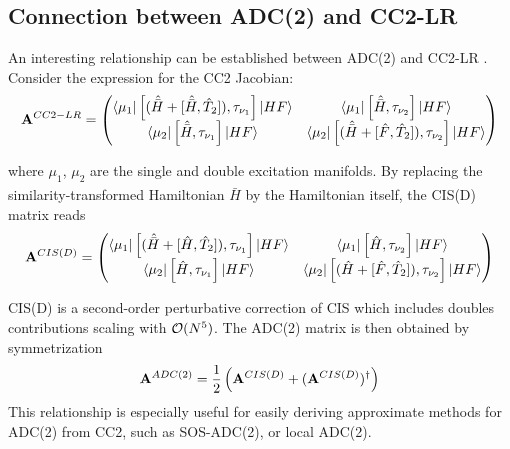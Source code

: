 
\subsection{Connection between ADC(2) and CC2-LR} 

An interesting relationship can be established between ADC(2) and CC2-LR \cite{Hf2005}. Consider the expression for the CC2 Jacobian:
\begin{equation}
\mathbf{A}^{CC2-LR} = \left( \begin{matrix}
\bra{\smash{\mu_1}} \left[ (\hat{\bar{H}} + \left[ \smash{ \hat{\bar{H}},\hat{T}_2} \right]), \tau_{\nu_1} \right] \ket{\smash{HF}} &  \bra{\smash{\mu_1}} \left[ \hat{\bar{H}}, \tau_{\nu_2} \right] \ket{\smash{HF}} \\
\bra{\smash{\mu_2}} \left[ \hat{\bar{H}}, \tau_{\nu_1} \right] \ket{\smash{HF}} & \bra{\smash{\mu_2}} \left[ (\hat{\bar{H}} + \left[ \smash{ \hat{F},\hat{T}_2} \right]), \tau_{\nu_2} \right] \ket{\smash{HF}}
\end{matrix}
\right)
\end{equation}

\noindent where $\mu_1$, $\mu_2$ are the single and double excitation manifolds. By replacing the similarity-transformed Hamiltonian $\hat{\bar{H}}$ by the Hamiltonian itself, the CIS(D) matrix reads
\begin{equation}
\mathbf{A}^{CIS(D)} = \left( \begin{matrix}
\bra{\smash{\mu_1}} \left[ (\hat{\bar{H}} + \left[ \smash{ \hat{H},\hat{T}_2} \right]), \tau_{\nu_1} \right] \ket{\smash{HF}} &  \bra{\smash{\mu_1}} \left[ \hat{H}, \tau_{\nu_2} \right] \ket{\smash{HF}} \\
\bra{\smash{\mu_2}} \left[ \hat{H}, \tau_{\nu_1} \right] \ket{\smash{HF}} & \bra{\smash{\mu_2}} \left[ (\hat{H} + \left[ \smash{ \hat{F},\hat{T}_2} \right]), \tau_{\nu_2} \right] \ket{\smash{HF}}
\end{matrix}
\right)
\end{equation}

\noindent CIS(D) is a second-order perturbative correction of CIS which includes doubles contributions \cite{Hea1994} scaling with $\mathcal{O}(N^{5})$. The ADC(2) matrix is then obtained by symmetrization
\begin{equation}
\mathbf{A}^{ADC(2)} = \frac{1}{2} \left(\mathbf{A}^{CIS(D)} + (\mathbf{A}^{CIS(D)})^{\dagger} \right)
\end{equation}
\noindent This relationship is especially useful for easily deriving approximate methods for ADC(2) from CC2, such as SOS-ADC(2), or local ADC(2).

